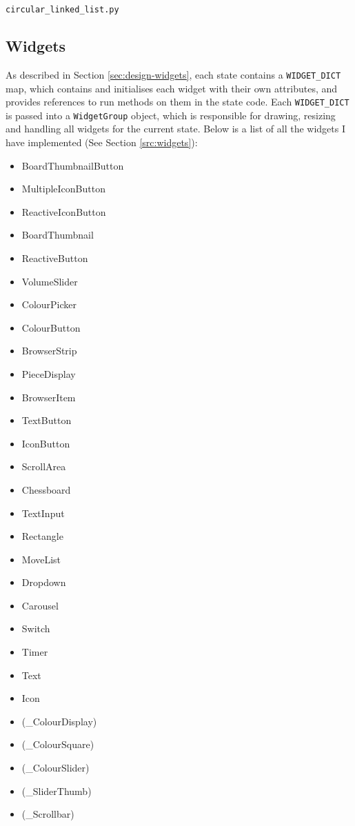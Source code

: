 \documentclass[../main/main.tex]{subfiles}
\begin{document}
\noindent\verb|circular_linked_list.py|


\subsection{Widgets}
\label{sec:widgets}
As described in Section \ref{sec:design-widgets}, each state contains a \lstinline{WIDGET_DICT} map, which contains and initialises each widget with their own attributes, and provides references to run methods on them in the state code. Each \lstinline{WIDGET_DICT} is passed into a \lstinline{WidgetGroup} object, which is responsible for drawing, resizing and handling all widgets for the current state.
Below is a list of all the widgets I have implemented (See Section \ref{src:widgets}):

\begin{multicols}{3}
\begin{itemize}
\item BoardThumbnailButton
\item MultipleIconButton
\item ReactiveIconButton
\item BoardThumbnail
\item ReactiveButton
\item VolumeSlider
\item ColourPicker
\item ColourButton
\item BrowserStrip
\item PieceDisplay
\item BrowserItem
\item TextButton
\item IconButton
\item ScrollArea
\item Chessboard
\item TextInput
\item Rectangle
\item MoveList
\item Dropdown
\item Carousel
\item Switch
\item Timer
\item Text
\item Icon
\item (\_ColourDisplay)
\item (\_ColourSquare)
\item (\_ColourSlider)
\item (\_SliderThumb)
\item (\_Scrollbar)
\end{itemize}
\end{multicols}
\end{document}
